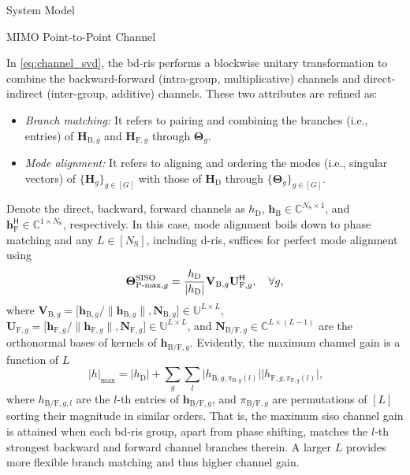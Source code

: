 \documentclass[journal]{IEEEtran}
\begin{document}
\begin{section}{System Model}
\begin{subsection}{MIMO Point-to-Point Channel}
		\begin{remark}
			In \eqref{eq:channel_svd}, the \gls{bd}-\gls{ris} performs a blockwise unitary transformation to combine the backward-forward (intra-group, multiplicative) channels and direct-indirect (inter-group, additive) channels.
			These two attributes are refined as:
			\begin{itemize}
				\item \emph{Branch matching:} It refers to pairing and combining the branches (i.e., entries) of $\mathbf{H}_{\mathrm{B},g}$ and $\mathbf{H}_{\mathrm{F},g}$ through $\mathbf{\Theta}_g$.
				\item \emph{Mode alignment:} It refers to aligning and ordering the modes (i.e., singular vectors) of $\{\mathbf{H}_g\}_{g \in [G]}$ with those of $\mathbf{H}_\mathrm{D}$ through $\{\mathbf{\Theta}_g\}_{g \in [G]}$.
			\end{itemize}
		\end{remark}

		\begin{example}
			\label{eg:siso}
			Denote the direct, backward, forward channels as $h_\mathrm{D}$, $\mathbf{h}_\mathrm{B} \in \mathbb{C}^{N_\mathrm{S} \times 1}$, and $\mathbf{h}_\mathrm{F}^\mathsf{H} \in \mathbb{C}^{1 \times N_\mathrm{S}}$, respectively.
			In this case, mode alignment boils down to phase matching and any $L \in [N_\mathrm{S}]$, including \gls{d}-\gls{ris}, suffices for perfect mode alignment using
			\begin{equation}
				\mathbf{\Theta}_{\textnormal{P-max},g}^\textnormal{SISO} = \frac{h_\mathrm{D}}{\lvert h_\mathrm{D} \rvert} \mathbf{V}_{\mathrm{B},g} \mathbf{U}_{\mathrm{F},g}^\mathsf{H}, \quad \forall g,
			\end{equation}
			where $\mathbf{V}_{\mathrm{B},g} = \bigl[\mathbf{h}_{\mathrm{B},g}/\lVert \mathbf{h}_{\mathrm{B},g} \rVert, \mathbf{N}_{\mathrm{B},g}\bigr] \in \mathbb{U}^{L \times L}$, $\mathbf{U}_{\mathrm{F},g} = \bigl[\mathbf{h}_{\mathrm{F},g}/\lVert \mathbf{h}_{\mathrm{F},g} \rVert, \mathbf{N}_{\mathrm{F},g}\bigr] \in \mathbb{U}^{L \times L}$, and $\mathbf{N}_{\mathrm{B/F},g} \in \mathbb{C}^{L \times (L-1)}$ are the orthonormal bases of kernels of $\mathbf{h}_{\mathrm{B/F},g}$.
			Evidently, the maximum channel gain is a function of $L$
			\begin{equation}
				\ \lvert h \rvert _{\max} = \lvert h_\mathrm{D} \rvert + \sum_g \sum_l \lvert h_{\mathrm{B},g,\pi_{\mathrm{B},g}(l)} \rvert \lvert h_{\mathrm{F},g,\pi_{\mathrm{F},g}(l)} \rvert,
			\end{equation}
			where $h_{\mathrm{B/F},g,l}$ are the $l$-th entries of $\mathbf{h}_{\mathrm{B/F},g}$, and $\pi_{\mathrm{B/F},g}$ are permutations of $[L]$ sorting their magnitude in similar orders.
			That is, the maximum \gls{siso} channel gain is attained when each \gls{bd}-\gls{ris} group, apart from phase shifting, matches the $l$-th strongest backward and forward channel branches therein.
			A larger $L$ provides more flexible branch matching and thus higher channel gain.
		\end{example}


\end{subsection}
\end{section}
\end{document}
